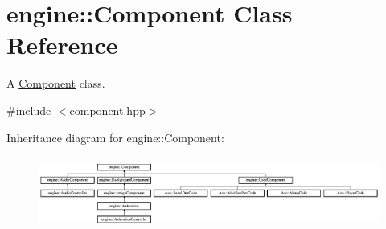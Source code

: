 \hypertarget{classengine_1_1_component}{}\section{engine\+:\+:Component Class Reference}
\label{classengine_1_1_component}


A \hyperlink{classengine_1_1_component}{Component} class.  




{\ttfamily \#include $<$component.\+hpp$>$}

Inheritance diagram for engine\+:\+:Component\+:\begin{figure}[H]
\begin{center}
\leavevmode
\includegraphics[height=2.393162cm]{classengine_1_1_component}
\end{center}
\end{figure}
